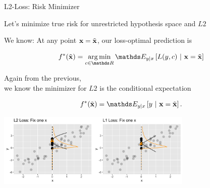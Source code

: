 \documentclass[11pt,compress,t,notes=noshow, xcolor=table]{beamer}
\begin{document}
\begin{vbframe}{L2-Loss: Risk Minimizer}

\begin{itemizeS}

\item Let's minimize true risk for unrestricted hypothesis space and $L2$

\item We know: At any point $\mathbf{x} = \tilde{\mathbf{x}}$, our loss-optimal prediction is 

$$\fbayes(\xtil) = \argmin_{c \in \R} \E_{y|x}\left[L(y, c)~|~ \xv = \xtil \right]$$ 

\item Again from the previous, \\
we know the minimizer for $L2$ is the conditional expectation 

$$f^{\ast}(\xtil) = \E_{y|x} \left[y ~|~ \xv = \xtil \right]. $$

\begin{center}
\includegraphics[width=0.7\textwidth]{figure/optimal_pointwise.png}
\end{center}


\end{itemizeS}





\end{vbframe}
\end{document}
